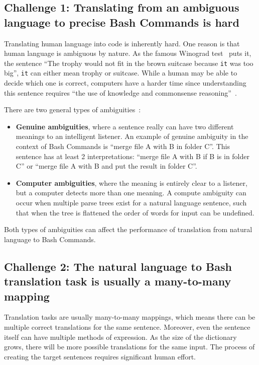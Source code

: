 \documentclass{river-journal}
\begin{document}
\subsection{\bf Challenge 1: Translating from an ambiguous language to precise Bash Commands is hard}
\label{ambiguous.section}
Translating human language into code is inherently hard. One reason is that human language is ambiguous by nature. As the famous Winograd test~\cite{Levesque2011TheWS} puts it, the sentence ``The trophy would not fit in the brown suitcase because \texttt{it} was too big'', \texttt{it} can either mean trophy or suitcase. While a human may be able to decide which one is correct, computers have a harder time since understanding this sentence requires ``the use of knowledge and commonsense reasoning''~\cite{Levesque2014OnOB}.

There are two general types of ambiguities~\cite{ambiguity}:
\begin{itemize}
    \item {\bf Genuine ambiguities}, where a sentence really can have two different meanings to an intelligent listener. An example of genuine ambiguity in the context of Bash Commands is ``merge file A with B in folder C''. This sentence has at least 2 interpretations: ``merge file A with B if B is in folder C'' or ``merge file A with B and put the result in folder C''.
    \item {\bf Computer ambiguities}, where the meaning is entirely clear to a listener, but a computer detects more than one meaning. A compute ambiguity can occur when multiple parse trees exist for a natural language sentence, such that when the tree is flattened the order of words for input can be undefined. 
\end{itemize}
Both types of ambiguities can affect the performance of translation from natural language to Bash Commands. 

\subsection{\bf Challenge 2: The natural language to Bash translation task is usually a many-to-many mapping}
\label{many2many.section}

Translation tasks are usually many-to-many mappings, which means there can be multiple correct translations for the same sentence. Moreover, even the sentence itself can have multiple methods of expression. As the size of the dictionary grows, there will be more possible translations for the same input. The process of creating the target sentences requires significant human effort.
\end{document}
